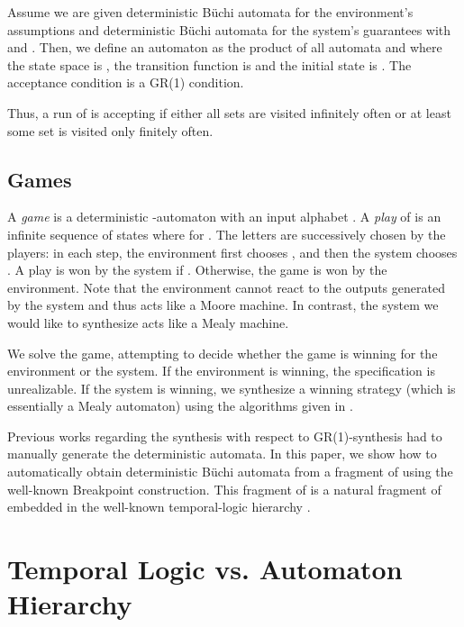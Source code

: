 \documentclass[submission,copyright,creativecommons]{eptcs}
\begin{document}
\begin{definition}\label{def:GR1-Automaton}
Assume we are given  deterministic Büchi automata  for the environment's assumptions and  deterministic Büchi automata  for the system's guarantees with  and . Then, we define an automaton  as the product of all automata  and  where the state space is , the transition function is  and the initial state is . The acceptance condition  is a GR(1) condition.
\end{definition}
Thus, a run of  is accepting if either all sets  are visited infinitely often or at least some set  is visited only finitely often.


\subsection{Games}
A \emph{game}  is a deterministic -automaton with an input alphabet . A \emph{play} of  is an infinite sequence of states  where  for . The letters  are successively chosen by the players: in each step, the environment first chooses , and then the system chooses . A play  is won by the system if . Otherwise, the game is won by the environment. Note that the environment cannot react to the outputs generated by the system and thus acts like a Moore machine. In contrast, the system we would like to synthesize acts like a Mealy machine. 

We solve the game, attempting to decide whether the game is winning for the environment or the system. If the environment is winning, the specification is unrealizable. If the system is winning, we synthesize a winning strategy (which is essentially a Mealy automaton) using the algorithms given in \cite{BGJP07,BGJP07a,JGWB07,PiPS06}. 

\noindent Previous works regarding the synthesis with respect to GR(1)-synthesis had to manually generate the deterministic automata. In this paper, we show how to automatically obtain deterministic Büchi automata from a fragment of \LTL{} using the well-known Breakpoint construction. This fragment of \LTL{} is a natural fragment of \LTL{} embedded in the well-known temporal-logic hierarchy \cite{MaPn87c,ChMP92,MaPn90,MaPn91,Schn01b,Schn03}.













\section{Temporal Logic vs. Automaton Hierarchy}
\end{document}
